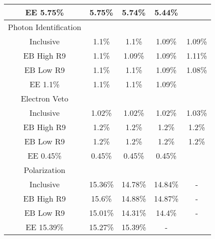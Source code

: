 \begin{tabular}{c|c|c|c|c}
EE 5.75\% & 5.75\% & 5.74\% & 5.44\% \\
\hline\hline
Photon Identification  & \multicolumn{4}{l}{} \\ \hline
Inclusive & 1.1\% & 1.1\% & 1.09\% & 1.09\% \\
EB High R9 & 1.1\% & 1.09\% & 1.09\% & 1.11\% \\
EB Low R9 & 1.1\% & 1.1\% & 1.09\% & 1.08\% \\
EE 1.1\% & 1.1\% & 1.1\% & 1.09\% \\
\hline\hline
Electron Veto  & \multicolumn{4}{l}{} \\ \hline
Inclusive & 1.02\% & 1.02\% & 1.02\% & 1.03\% \\
EB High R9 & 1.2\% & 1.2\% & 1.2\% & 1.2\% \\
EB Low R9 & 1.2\% & 1.2\% & 1.2\% & 1.2\% \\
EE 0.45\% & 0.45\% & 0.45\% & 0.45\% \\
\hline\hline
Polarization  & \multicolumn{4}{l}{} \\ \hline
Inclusive & 15.36\% & 14.78\% & 14.84\% & - \\
EB High R9 & 15.6\% & 14.88\% & 14.87\% & - \\
EB Low R9 & 15.01\% & 14.31\% & 14.4\% & - \\
EE 15.39\% & 15.27\% & 15.39\% & - \\
\hline\hline

\end{tabular}

 

